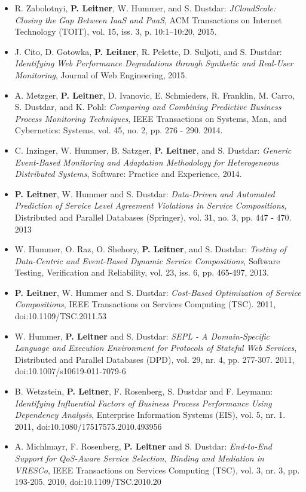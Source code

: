 \documentclass[paper=letter,fontsize=11pt]{scrartcl} %
\begin{document}
\begin{itemize}
\begin{shaded}
   \end{shaded}
  \item  R. Zabolotnyi, \textbf{P. Leitner}, W. Hummer, and S. Dustdar: \emph{JCloudScale: Closing the Gap Between IaaS and PaaS}, ACM Transactions on Internet Technology (TOIT),  vol. 15, iss. 3, p. 10:1–10:20, 2015.
  \item J. Cito, D. Gotowka, \textbf{P. Leitner}, R. Pelette, D. Suljoti, and S. Dustdar: \emph{Identifying Web Performance Degradations through Synthetic and Real-User Monitoring}, Journal of Web Engineering, 2015.
  \item  A. Metzger, \textbf{P. Leitner}, D. Ivanovic, E. Schmieders, R. Franklin, M. Carro, S. Dustdar, and K. Pohl: \emph{Comparing and Combining Predictive Business Process Monitoring Techniques}, IEEE Transactions on Systems, Man, and Cybernetics: Systems, vol. 45, no. 2, pp. 276 - 290. 2014.
  \item C. Inzinger, W. Hummer, B. Satzger, \textbf{P. Leitner}, and S. Dustdar: \emph{Generic Event-Based Monitoring and Adaptation Methodology for Heterogeneous Distributed Systems}, Software: Practice and Experience, 2014.
  \item \textbf{P. Leitner}, W. Hummer and S. Dustdar: \emph{Data-Driven and Automated Prediction of Service Level Agreement Violations in Service Compositions}, Distributed and Parallel Databases (Springer), vol. 31, no. 3, pp. 447 - 470. 2013
  \item W. Hummer, O. Raz, O. Shehory, \textbf{P. Leitner}, and S. Dustdar: \emph{Testing of Data-Centric and Event-Based Dynamic Service Compositions}, Software Testing, Verification and Reliability, vol. 23, iss. 6, pp. 465-497, 2013.
  \item \textbf{P. Leitner}, W. Hummer and S. Dustdar: \emph{Cost-Based
  Optimization of Service Compositions}, IEEE Transactions on Services Computing (TSC). 2011, doi:10.1109/TSC.2011.53
\item W. Hummer, \textbf{P. Leitner} and S. Dustdar: \emph{SEPL - A
Domain-Specific Language and Execution Environment for Protocols of Stateful Web
Services}, Distributed and Parallel Databases (DPD), vol. 29, nr. 4, pp.
277-307. 2011, doi:10.1007/s10619-011-7079-6
\item B. Wetzstein, \textbf{P. Leitner}, F. Rosenberg, S. Dustdar and F. Leymann: \emph{Identifying Influential Factors of Business Process Performance Using Dependency Analysis}, Enterprise Information Systems (EIS), vol. 5, nr. 1. 2011, doi:10.1080/17517575.2010.493956
\item A. Michlmayr, F. Rosenberg, \textbf{P. Leitner} and S. Dustdar: \emph{End-to-End Support for QoS-Aware Service Selection, Binding and Mediation in VRESCo}, IEEE Transactions on Services Computing (TSC), vol. 3, nr. 3, pp. 193-205. 2010, doi:10.1109/TSC.2010.20

\end{itemize}
\end{document}
